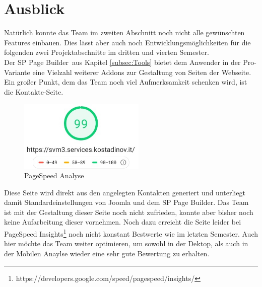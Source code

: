 \documentclass[12pt,a4paper]{article}
\begin{document}
\section{Ausblick}
Natürlich konnte das Team im zweiten Abschnitt noch nicht alle gewünschten Features einbauen.
Dies lässt aber auch noch Entwicklungsmöglichkeiten für die folgenden zwei Projektabschnitte im dritten und vierten Semester.\\
Der \glqq SP Page Builder\grqq \ aus Kapitel \ref{subsec:Tools} bietet dem Anwender in der Pro-Variante eine Vielzahl weiterer Addons zur Gestaltung von Seiten der Webseite.\\
Ein großer Punkt, dem das Team noch viel Aufmerksamkeit schenken wird, ist die Kontakte-Seite.
\begin{figure}
  \includegraphics[width=6cm]{PageSpeedInsightsNeu.jpeg}
  \caption{PageSpeed Analyse}
  \label{img:PageSpeed}
\end{figure}
Diese Seite wird direkt aus den angelegten Kontakten generiert und unterliegt damit Standardeinstellungen von Joomla und dem SP Page Builder. Das Team ist mit der Gestaltung dieser Seite noch nicht zufrieden, konnte aber bisher noch keine Aufarbeitung dieser vornehmen.
Noch dazu erreicht die Seite leider bei PageSpeed Insights\footnote{\label{foot:PageSpeed} https://developers.google.com/speed/pagespeed/insights/} noch nicht konstant Bestwerte wie im letzten Semester. Auch hier möchte das Team weiter optimieren, um sowohl in der Dektop, als auch in der Mobilen Anaylse wieder eine sehr gute Bewertung zu erhalten.
\end{document}
